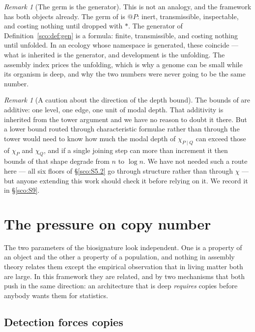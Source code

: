 \documentclass[11pt]{article}
\makeatletter
\theoremstyle{plain}
\theoremstyle{definition}
\theoremstyle{remark}
\newtheorem{remark}[theorem]{Remark}
\newcommand{\quo}[1]{@#1}
\newcommand{\drop}[1]{*#1}
\makeatother
\begin{document}
\begin{remark}[The germ is the generator]\label{sco:rem:germgen}
This is not an analogy, and the framework has both objects already. The
germ of \cite[\S11]{scientist} is $\quo{P}$: inert, transmissible,
inspectable, and costing nothing until dropped with $\drop{}$. The
generator of Definition~\ref{sco:def:gen} is a formula: finite,
transmissible, and costing nothing until unfolded. In an ecology whose
namespace is generated, these coincide --- what is inherited is the
generator, and development is the unfolding. The assembly index prices the
unfolding, which is why a genome can be small while its organism is deep,
and why the two numbers were never going to be the same number.
\end{remark}

\begin{remark}[A caution about the direction of the depth bound]
\label{sco:rem:direction}
The bounds of \cite[Ch.~44]{book} are additive: one level, one edge, one
unit of modal depth. That additivity is inherited from the tower argument
and we have no reason to doubt it there. But a lower bound routed through
characteristic formulae rather than through the tower would need to know
how much the modal depth of $\chi_{P \mid Q}$ can exceed those of $\chi_P$
and $\chi_Q$, and if a single joining step can more than increment it then
bounds of that shape degrade from $n$ to $\log n$. We have not needed such
a route here --- all six floors of \S\ref{sco:S5.2} go through structure
rather than through $\chi$ --- but anyone extending this work should check
it before relying on it. We record it in \S\ref{sco:S9}.
\end{remark}

\section{The pressure on copy number}\label{sco:S7}

The two parameters of the biosignature look independent. One is a property
of an object and the other a property of a population, and nothing in
assembly theory relates them except the empirical observation that in
living matter both are large. In this framework they are related, and by
two mechanisms that both push in the same direction: an architecture that
is deep \emph{requires} copies before anybody wants them for statistics.

\subsection{Detection forces copies}\label{sco:S7.1}
\end{document}
